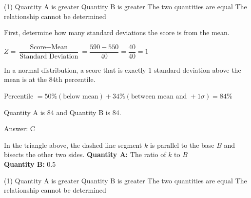 \documentclass[11pt,paper=a4,answers]{exam}
\begin{document}
\begin{questions}
\begin{tasks}(1)
\task[A)] Quantity A is greater
\task[B)] Quantity B is greater
\task[C)] The two quantities are equal
\task[D)] The relationship cannot be determined
\end{tasks}

\begin{solution}
First, determine how many standard deviations the score is from the mean.
\vspace{5pt}
\begin{center}
$Z = \dfrac{\text{Score} - \text{Mean}}{\text{Standard Deviation}} = \dfrac{590 - 550}{40} = \dfrac{40}{40} = 1$
\end{center}
\vspace{5pt}
In a normal distribution, a score that is exactly 1 standard deviation above the mean is at the 84th percentile.
\vspace{5pt}
\begin{center}
Percentile $= 50\% (\text{below mean}) + 34\% (\text{between mean and } +1\sigma) = 84\%$
\end{center}
\vspace{5pt}
Quantity A is 84 and Quantity B is 84.

Answer: \colorbox{yellow!100}{C}
\end{solution}

\vspace{1cm}

\question
\begin{center}
\end{center}
In the triangle above, the dashed line segment $k$ is parallel to the base $B$ and bisects the other two sides.
\vspace{5pt}
\textbf{Quantity A: } The ratio of $k$ to $B$ \\
\vspace{5pt}
\textbf{Quantity B: } 0.5

\begin{tasks}(1)
\task[A)] Quantity A is greater
\task[B)] Quantity B is greater
\task[C)] The two quantities are equal
\task[D)] The relationship cannot be determined
\end{tasks}


\end{questions}
\end{document}
